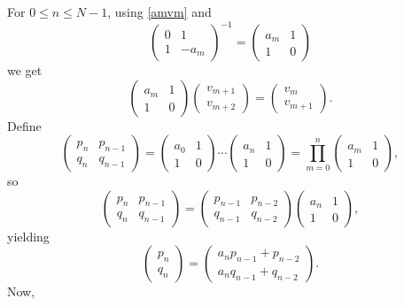 \documentclass{article}
\begin{document}
For $0 \leq n \leq N-1$,
using \eqref{amvm} and
\[
\begin{pmatrix} 0&1\\1&-a_m\end{pmatrix}^{-1}
=\begin{pmatrix}a_m&1\\1&0\end{pmatrix}
\]
we get
\[
\begin{pmatrix}a_m&1\\1&0\end{pmatrix} \begin{pmatrix} v_{m+1}\\v_{m+2}\end{pmatrix} = \begin{pmatrix} v_m\\v_{m+1} \end{pmatrix}.
\]
Define
\begin{equation}
\begin{pmatrix}p_n&p_{n-1}\\
q_n&q_{n-1}
\end{pmatrix}
= \begin{pmatrix} a_0&1\\1&0\end{pmatrix} \cdots  \begin{pmatrix} a_n&1\\1&0\end{pmatrix}
=\prod_{m=0}^n  \begin{pmatrix} a_m&1\\1&0\end{pmatrix},
\label{pnqn}
\end{equation}
so 
\[
\begin{pmatrix}p_n&p_{n-1}\\
q_n&q_{n-1}
\end{pmatrix}
=\begin{pmatrix}p_{n-1}&p_{n-2}\\
q_{n-1}&q_{n-2}
\end{pmatrix}
 \begin{pmatrix} a_n&1\\1&0\end{pmatrix},
\]
yielding
\[
\begin{pmatrix} p_n \\ q_n \end{pmatrix}
=\begin{pmatrix}a_n p_{n-1} + p_{n-2}\\
a_nq_{n-1}+q_{n-2}
\end{pmatrix}.
\]
Now,
\end{document}
